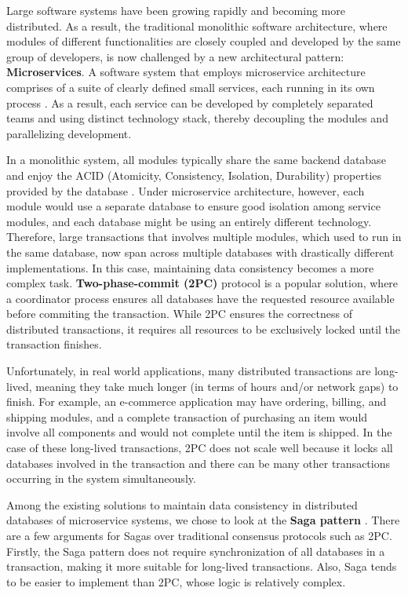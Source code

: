 Large software systems have been growing rapidly and becoming more distributed. As a result, the traditional monolithic software architecture, where modules of different functionalities are closely coupled and developed by the same group of developers, is now challenged by a new architectural pattern: \textbf{Microservices}. A software system that employs microservice architecture comprises of a suite of clearly defined small services, each running in its own process \cite{lewis2014microservices}. As a result, each service can be developed by completely separated teams and using distinct technology stack, thereby decoupling the modules and parallelizing development.

In a monolithic system, all modules typically share the same backend database and enjoy the ACID (Atomicity, Consistency, Isolation, Durability) properties provided by the database \cite{gray1981transaction}. Under microservice architecture, however, each module would use a separate database to ensure good isolation among service modules, and each database might be using an entirely different technology. Therefore, large transactions that involves multiple modules, which used to run in the same database, now span across multiple databases with drastically different implementations. In this case, maintaining data consistency becomes a more complex task. \textbf{Two-phase-commit (2PC)} protocol \cite{bernstein1987concurrency} is a popular solution, where a coordinator process ensures all databases have the requested resource available before commiting the transaction. While 2PC ensures the correctness of distributed transactions, it requires all resources to be exclusively locked until the transaction finishes.

Unfortunately, in real world applications, many distributed transactions are long-lived, meaning they take much longer (in terms of hours and/or network gaps) to finish. For example, an e-commerce application may have ordering, billing, and shipping modules, and a complete transaction of purchasing an item would involve all components and would not complete until the item is shipped. In the case of these long-lived transactions, 2PC does not scale well because it locks all databases involved in the transaction and there can be many other transactions occurring in the system simultaneously.

Among the existing solutions to maintain data consistency in distributed databases of microservice systems, we chose to look at the \textbf{Saga pattern} \cite{garcia1987sagas}. There are a few arguments for Sagas over traditional consensus protocols such as 2PC. Firstly, the Saga pattern does not require synchronization of all databases in a transaction, making it more suitable for long-lived transactions. Also, Saga tends to be easier to implement than 2PC, whose logic is relatively complex.
